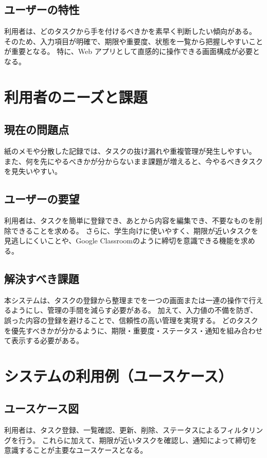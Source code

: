 \documentclass[dvipdfmx,10pt]{jarticle}
\begin{document}
    \subsection{ユーザーの特性}
    利用者は、どのタスクから手を付けるべきかを素早く判断したい傾向がある。
    そのため、入力項目が明確で、期限や重要度、状態を一覧から把握しやすいことが重要となる。
    特に、Web アプリとして直感的に操作できる画面構成が必要となる。

    \pagebreak

    \section{利用者のニーズと課題}
    \label{sec:needs}
    \subsection{現在の問題点}
    紙のメモや分散した記録では、タスクの抜け漏れや重複管理が発生しやすい。
    また、何を先にやるべきかが分からないまま課題が増えると、今やるべきタスクを見失いやすい。

    \subsection{ユーザーの要望}
    利用者は、タスクを簡単に登録でき、あとから内容を編集でき、不要なものを削除できることを求める。
    さらに、学生向けに使いやすく、期限が近いタスクを見逃しにくいことや、Google Classroomのように締切を意識できる機能を求める。

    \subsection{解決すべき課題}
    本システムは、タスクの登録から整理までを一つの画面または一連の操作で行えるようにし、管理の手間を減らす必要がある。
    加えて、入力値の不備を防ぎ、誤った内容の登録を避けることで、信頼性の高い管理を実現する。
    どのタスクを優先すべきかが分かるように、期限・重要度・ステータス・通知を組み合わせて表示する必要がある。

    \pagebreak

    \section{システムの利用例（ユースケース）}
    \label{sec:usecase}
    \subsection{ユースケース図}
    利用者は、タスク登録、一覧確認、更新、削除、ステータスによるフィルタリングを行う。
    これらに加えて、期限が近いタスクを確認し、通知によって締切を意識することが主要なユースケースとなる。
\end{document}
